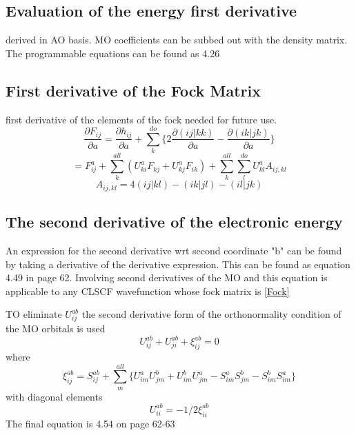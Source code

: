 	\subsection{Evaluation of the energy first derivative}
		derived in AO basis. MO coefficients can be subbed out with the density matrix.  The programmable equations can be found as 4.26

	\subsection{First derivative of the Fock Matrix}
		first derivative of the elements of the fock needed for future use.  
			\begin{equation}
				\frac{\partial F_{ij}}{\partial a} = \frac{\partial h_{ij}}{\partial a} + \sum_k^{do}\{2\frac{\partial (ij|kk)}{\partial a} - \frac{\partial (ik|jk)}{\partial a}\}
			\end{equation}
			\begin{equation}
				= F^a_{ij} + \sum_k^{all}(U^a_{ki}F_{kj} + U^a_{kj}F_{ik}) + \sum_k^{all} \sum_{l}^{do} U^a_{kl} A_{ij,kl}
			\end{equation}
			\begin{equation}
				A_{ij,kl} = 4(ij|kl) - (ik|jl) - (il|jk)
			\end{equation}

	\subsection{The second derivative of the electronic energy}
		An expression for the second derivative wrt second coordinate "b" can be found by taking a derivative of the derivative expression. This can be found as equation 4.49 in page 62.  Involving second derivatives of the MO and this equation is applicable to any CLSCF wavefunction whose fock matrix is \cref{Fock}

		TO eliminate $U_{ij}^{ab}$ the second derivative form of the orthonormality condition of the MO orbitals is used
			\begin{equation}
				U^{ab}_{ij} + U^{ab}_{ji} + \xi^{ab}_{ij} = 0
			\end{equation}
		where 
			\begin{equation}
				\xi^{ab}_{ij} = S^{ab}_{ij} + \sum_m^{all}\{ U^a_{im} U^b_{jm} + U^b_{im}U^a_{jm} - S^a_{im}S^b_{jm} - S^b_{im}S^a_{im} \}
			\end{equation}
		with diagonal elements 
			\begin{equation}
				U^{ab}_{ii} = -1/2 \xi^{ab}_{ii}
			\end{equation}
		The final equation is 4.54 on page 62-63
